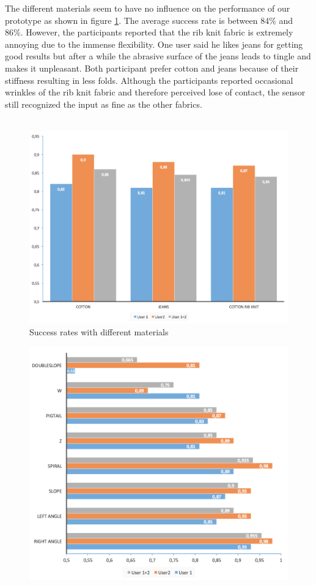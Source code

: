 The different materials seem to have no influence on the performance of our prototype as shown in figure \ref{fig:materials}. The average success rate is between 84\% and 86\%. However, the participants reported that the rib knit fabric is extremely annoying due to the immense flexibility. One user said he likes jeans for getting good results but after a while the abrasive surface of the jeans leads to tingle and makes it unpleasant. Both participant prefer cotton and jeans because of their stiffness resulting in less folds. Although the participants reported occasional wrinkles of the rib knit fabric and therefore perceived lose of contact, the sensor still recognized the input as fine as the other fabrics. 
\\ \\
\begin{center}
\begin{figure}
\includegraphics[scale=0.1]{images/materials.jpg}
\caption{Success rates with different materials}
\label{fig:materials}
\end{figure}
\begin{figure}
\includegraphics[scale=0.13]{images/gestures.jpg}

\end{figure}
\end{center}

